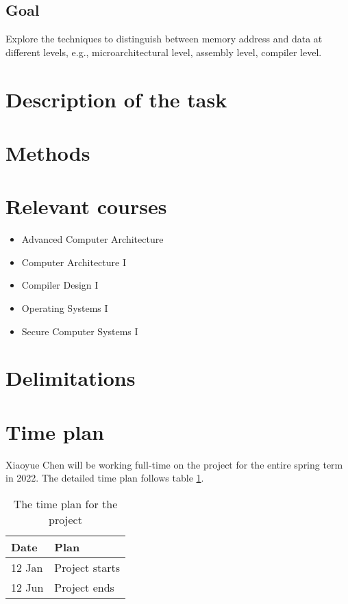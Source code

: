 \documentclass[a4paper]{article}
\begin{document}
\subsection{Goal}
Explore the techniques to distinguish between memory address and data
at different levels, e.g., microarchitectural level, assembly level,
compiler level.

\section{Description of the task}

\section{Methods}

\section{Relevant courses}
\begin{itemize}
\item Advanced Computer Architecture
\item Computer Architecture I
\item Compiler Design I
\item Operating Systems I
\item Secure Computer Systems I
\end{itemize}

\section{Delimitations}

\section{Time plan}
Xiaoyue Chen will be working full-time on the project for the entire
spring term in 2022. The detailed time plan follows table
\ref{tab:timeplan}.
\begin{table}[h]
  \centering
  \begin{tabular}{ll}
    \toprule
    Date &  Plan \\
    \midrule
    12 Jan & Project starts \\
    12 Jun & Project ends \\
    \bottomrule
  \end{tabular}
  \caption{The time plan for the project}
  \label{tab:timeplan}
\end{table}


 
\end{document}
